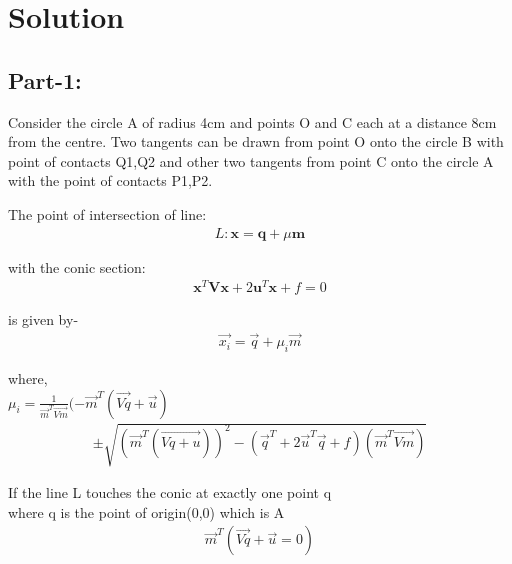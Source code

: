 \documentclass[journal,12pt,twocolumn]{IEEEtran}
\begin{document}
\section{Solution}
\raggedright{\subsection{Part-1:}}
Consider the circle A of radius 4cm and points O and C each at a distance 8cm from the centre. Two tangents can be drawn from point O onto the circle B with point of contacts Q1,Q2 and other two tangents from point C onto the circle A with the point of contacts P1,P2.\\
\vspace{0.25cm}
\raggedright{The point of intersection of line:}\\
\begin{align}
L:\textbf{x}=\textbf{q}+\mu \textbf{m}           
\label{eq1}
\end{align}
\raggedright{with the conic section:}\\
\begin{align}
\textbf{x}^T\textbf{Vx}+2\textbf{u}^T\textbf{x}+f=0     
\label{eq2}
\end{align}
\raggedright{is given by-}\\
\begin{align}
\vec{x_i}=\vec{q}+\mu_i\vec{m}             
\label{eq3}
\end{align}
\raggedright{where,}\\
$\mu_i=\frac{1}{\vec{m}^T\vec{Vm}}(-\vec{m}^T(\vec{Vq}+\vec{u})$\\ 
\begin{align}
\pm\sqrt{(\vec{m}^T(\vec{Vq+u}))^2-(\vec{q}^T+2\vec{u}^T\vec{q}+f)(\vec{m}^T\vec{Vm})}                 
\label{eq4}
\end{align}
\vspace{0.25cm}
\raggedright{If the line L touches the conic at exactly one point q}\\
where q is the point of origin(0,0) which is A\\
\begin{align}
\vec{m}^T(\vec{Vq}+\vec{u}=0)                 
\label{eq5}
\end{align}
\end{document}
